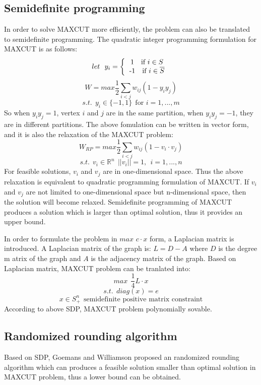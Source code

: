 \documentclass[11pt]{article}
\begin{document}
\subsection{Semidefinite programming}
In order to solve MAXCUT more efficiently, the problem can also be translated to semidefinite programming. The quadratic integer programming formulation for MAXCUT is as follows:
$$let\  \ y_i=
\left \{
  \begin{tabular}{c}
  1 \  \ \text{if $i\in S$}\\
  -1 \   \ \text{if $i\in \overline{S}$}\\
  \end{tabular}\right.$$
  $$W=max \frac{1}{2}\sum_{i<j}w_{ij}(1-y_iy_j) $$
  $$s.t.\ \ y_i \in \{-1,1\}\ \ \textrm{for $i=1,...,m$}$$
So when $y_iy_j=1$, vertex $i$ and $j$ are in the same partition, when $y_iy_j=-1$, they are in different partitions. The above fomulation can be written in vector form, and it is also the relaxation of the MAXCUT problem:
$$W_{RP}=max\frac{1}{2}\sum _{i<j}w_{ij}(1-v_i\cdot v_j)$$
 $$s.t.\ \ v_i \in \mathbb{R}^n\ \ \textrm{$||v_i||=1,\ \ i=1,...,n$}$$
 For feasible solutions, $v_i$ and $v_j$ are in one-dimensional space. Thus the above relaxation is equivalent to quadratic programming formulation of MAXCUT. If $v_i$ and $v_j$ are not limited to one-dimensional space but n-dimensional space, then the solution will become relaxed. Semidefinite programming of MAXCUT produces a solution which is larger than optimal solution, thus it provides an upper bound. 
 
 In order to formulate the problem in $max$ $c\cdot x$ form, a Laplacian matrix is introduced. A Laplacian matrix of the graph is: $L=D-A$ where $D$ is the degree m    atrix of the graph and $A$ is the adjacency matrix of the graph. Based on Laplacian matrix, MAXCUT problem can be tranlated into:
 $$max\ \ \frac{1}{4} L\cdot x$$
 $$s.t.\ \ diag(x)=e$$
 $$x\in S^n_+\ \ \textrm{semidefinite positive matrix constraint}$$
 According to above SDP, MAXCUT problem polynomially sovable.
\subsection{Randomized rounding algorithm}
Based on SDP, Goemans and Williamson proposed an randomized rounding algorithm which can produces a feasible solution smaller than optimal solution in MAXCUT problem, thus a lower bound can be obtained.
\end{document}
